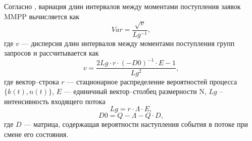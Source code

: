 Согласно \cite{вишневский2018стохастические}, вариация длин интервалов между моментами поступления заявок MMPP вычисляется как
\begin{equation}
	Var = \frac{\sqrt{v}}{Lg^{-1}},
\end{equation}
где $v$ --- дисперсия длин интервалов между моментами поступления групп запросов и рассчитывается как
\begin{equation}
	v = \frac{2Lg\cdot r \cdot (-D0)^{-1} \cdot E -1}{Lg^2},
\end{equation}
где вектор--строка $r$ --- стационарное распределение вероятностей процесса\\$\{k(t),n(t)\}$, $E$ --- единичный вектор--столбец размерности N, $Lg$ -- интенсивность входящего потока
\begin{equation} \label{eq_lg}
	Lg = r\cdot \Lambda \cdot E,
\end{equation}
\begin{equation*}
	D0 = Q - \Lambda - Q\cdot D,
\end{equation*}
где $D$ --- матрица, содержащая вероятности наступления события в потоке при смене его состояния.
\clearpage
